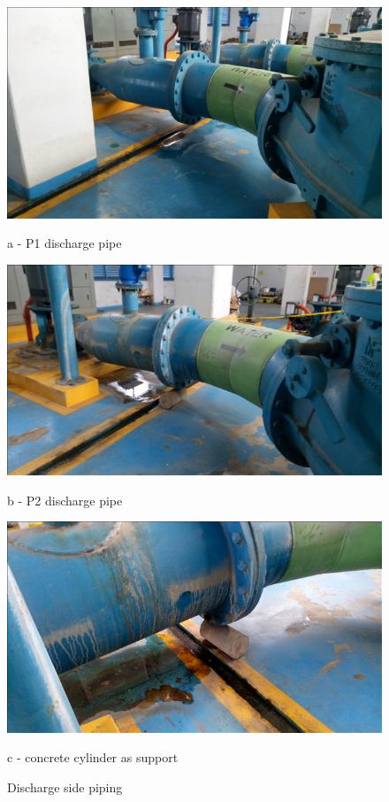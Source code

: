 \begin{figure}
	\begin{minipage}[b]{0.3\linewidth}
		\centering
		\includegraphics[width=\textwidth]{figures/fig_ch043_discharge_run_p1}
		\caption*{a - P1 discharge pipe}
		\label{ch043_discharge_run_p1}
	\end{minipage}
	\hspace{0.05cm}
	\begin{minipage}[b]{0.3\linewidth}
		\centering
		\includegraphics[width=\textwidth]{figures/fig_ch043_discharge_run_p2}
		\caption*{b - P2 discharge pipe}
		\label{ch043_discharge_run_p2}
	\end{minipage}
	\hspace{0.05cm}
	\begin{minipage}[b]{0.3\linewidth}
		\centering
		\includegraphics[width=\textwidth]{figures/fig_ch043_adhoc_support}
		\caption*{c - concrete cylinder as support}
		\label{ch043_adhoc_support}
	\end{minipage}
\caption{Discharge side piping}
\label{fig_ch043_discharge_run}
\end{figure}

